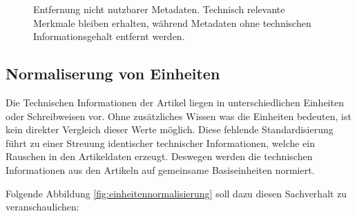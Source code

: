 \begin{figure}[H]
\begin{tikzpicture}
        \end{tikzpicture} 
        \caption{Entfernung nicht nutzbarer Metadaten. Technisch relevante Merkmale bleiben erhalten, während Metadaten ohne technischen Informationsgehalt entfernt werden.} 
        \label{fig:metadaten_filter} 
        \end{figure}


\subsection{Normaliserung von Einheiten} 

Die Technischen Informationen der Artikel liegen in unterschiedlichen Einheiten oder Schreibweisen vor. Ohne zusätzliches Wissen was die Einheiten bedeuten,
ist kein direkter Vergleich dieser Werte möglich. Diese fehlende Standardisierung führt zu einer Streuung identischer technischer Informationen, welche ein Rauschen in den Artikeldaten erzeugt.
Deswegen werden die technischen Informationen aus den Artikeln auf gemeinsame Basiseinheiten normiert.

Folgende Abbildung \ref{fig:einheitennormalisierung} soll dazu diesen Sachverhalt zu veranschaulichen:

